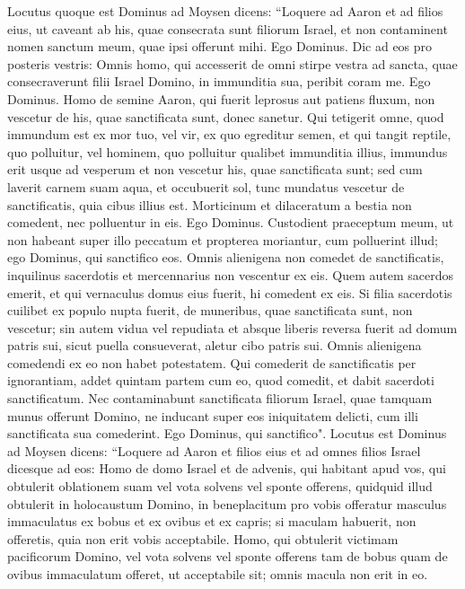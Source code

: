 \begin{biblechapter}  
\verse Locutus quoque est Dominus ad Moysen dicens: 
\verse “Loquere ad Aaron et ad filios eius, ut caveant ab his, quae consecrata sunt filiorum Israel, et non contaminent nomen sanctum meum, quae ipsi offerunt mihi. Ego Dominus. 
\verse Dic ad eos pro posteris vestris: Omnis homo, qui accesserit de omni stirpe vestra ad sancta, quae consecraverunt filii Israel Domino, in immunditia sua, peribit coram me. Ego Dominus. 
\verse Homo de semine Aaron, qui fuerit leprosus aut patiens fluxum, non vescetur de his, quae sanctificata sunt, donec sanetur. Qui tetigerit omne, quod immundum est ex mor tuo, vel vir, ex quo egreditur semen, 
\verse et qui tangit reptile, quo polluitur, vel hominem, quo polluitur qualibet immunditia illius, 
\verse immundus erit usque ad vesperum et non vescetur his, quae sanctificata sunt; sed cum laverit carnem suam aqua, 
\verse et occubuerit sol, tunc mundatus vescetur de sanctificatis, quia cibus illius est. 
\verse Morticinum et dilaceratum a bestia non comedent, nec polluentur in eis. Ego Dominus. 
\verse Custodient praeceptum meum, ut non habeant super illo peccatum et propterea moriantur, cum polluerint illud; ego Dominus, qui sanctifico eos. 
\verse Omnis alienigena non comedet de sanctificatis, inquilinus sacerdotis et mercennarius non vescentur ex eis. 
\verse Quem autem sacerdos emerit, et qui vernaculus domus eius fuerit, hi comedent ex eis. 
\verse Si filia sacerdotis cuilibet ex populo nupta fuerit, de muneribus, quae sanctificata sunt, non vescetur; 
\verse sin autem vidua vel repudiata et absque liberis reversa fuerit ad domum patris sui, sicut puella consueverat, aletur cibo patris sui. Omnis alienigena comedendi ex eo non habet potestatem. 
\verse Qui comederit de sanctificatis per ignorantiam, addet quintam partem cum eo, quod comedit, et dabit sacerdoti sanctificatum. 
\verse Nec contaminabunt sanctificata filiorum Israel, quae tamquam munus offerunt Domino, 
\verse ne inducant super eos iniquitatem delicti, cum illi sanctificata sua comederint. Ego Dominus, qui sanctifico". 
\verse Locutus est Dominus ad Moysen dicens: 
\verse “Loquere ad Aaron et filios eius et ad omnes filios Israel dicesque ad eos: Homo de domo Israel et de advenis, qui habitant apud vos, qui obtulerit oblationem suam vel vota solvens vel sponte offerens, quidquid illud obtulerit in holocaustum Domino, 
\verse in beneplacitum pro vobis offeratur masculus immaculatus ex bobus et ex ovibus et ex capris; 
\verse si maculam habuerit, non offeretis, quia non erit vobis acceptabile. 
\verse Homo, qui obtulerit victimam pacificorum Domino, vel vota solvens vel sponte offerens tam de bobus quam de ovibus immaculatum offeret, ut acceptabile sit; omnis macula non erit in eo. 

\end{biblechapter}
